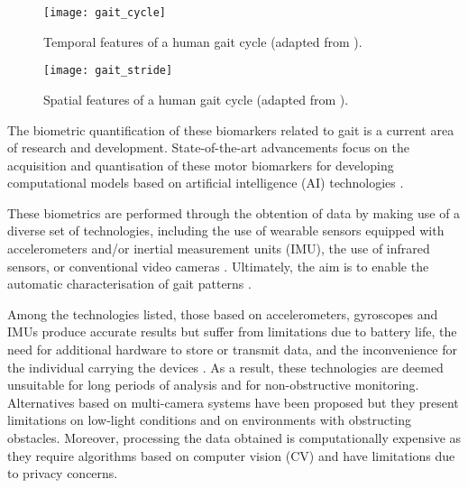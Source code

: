 	\begin{figure}[ht]
		\centering
		\texttt{[image: gait\_cycle]}
		\caption[Temporal features of a human gait cycle.]{Temporal features of a human gait cycle (adapted from \cite{Zanardi2021}).}
		\label{fig:gait_drawing}
	\end{figure}
	
	\begin{figure}[ht]
		\centering
		\texttt{[image: gait\_stride]}
		\caption[Spatial features of a human gait cycle.]{Spatial features of a human gait cycle (adapted from \cite{Biase2020}).}
		\label{fig:gait_stride}
	\end{figure}
	
	\label{sec:gait_methods}
	
	The biometric quantification of these biomarkers related to gait is a current area of research and development. State-of-the-art advancements focus on the acquisition and quantisation of these motor biomarkers for developing computational models based on artificial intelligence (AI) technologies \cite{Karabacak2013,Trabassi2022}.
	
	These biometrics are performed through the obtention of data by making use of a diverse set of technologies, including the use of wearable sensors equipped with accelerometers and/or inertial measurement units (IMU), the use of infrared sensors, or conventional video cameras \cite{Biase2020,Zanardi2021}. Ultimately, the aim is to enable the automatic characterisation of gait patterns \cite{Biase2020,Perumal2016}.%
	
	Among the technologies listed, those based on accelerometers, gyroscopes and IMUs produce accurate results but suffer from limitations due to battery life, the need for additional hardware to store or transmit data, and the inconvenience for the individual carrying the devices \cite{Biase2020}. As a result, these technologies are deemed unsuitable for long periods of analysis and for non-obstructive monitoring. Alternatives based on multi-camera systems have been proposed \cite{MurodelaHerran2014} but they present limitations on low-light conditions and on environments with obstructing obstacles. Moreover, processing the data obtained is computationally expensive as they require algorithms based on computer vision (CV) and have limitations due to privacy concerns.
	
